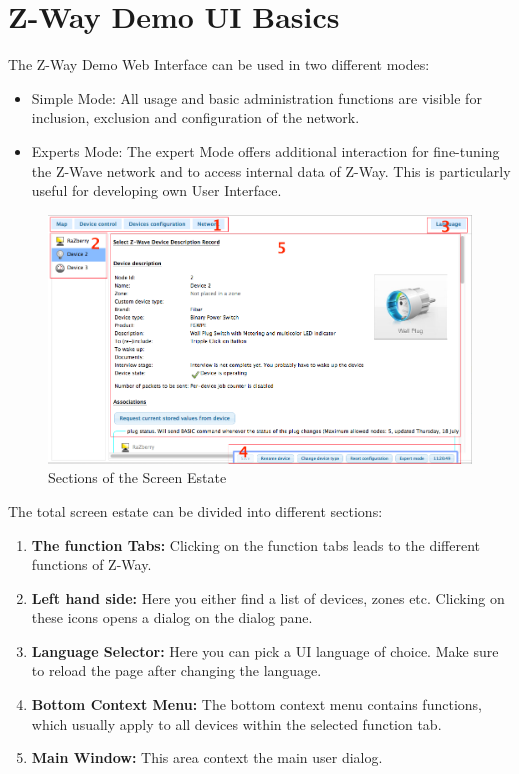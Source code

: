 \section{Z-Way Demo UI Basics}

The Z-Way Demo Web Interface can be used in two different modes:

\begin{itemize}
\item Simple Mode: All usage and basic administration functions are visible for inclusion, 
exclusion and configuration of the network. 

\item Experts Mode: The expert Mode offers additional interaction for fine-tuning the Z-Wave network
and to access internal data of Z-Way. This is particularly useful for developing own User Interface.
\end{itemize}
 
\begin{figure} 
\begin{center}
\includegraphics[scale=0.4]{pics/map3.png}
\caption{Sections of the Screen Estate}
\label{uc3:general} 
\end{center} 
\end{figure}


The total screen estate can be divided into different sections: 
\begin {enumerate}
\item {\bf The function Tabs:} Clicking on the function tabs leads to the different functions of Z-Way.
\item {\bf Left hand side:} Here you either find a list of devices, zones etc. Clicking on these icons opens a 
dialog on the dialog pane.
\item {\bf Language Selector:} Here you can pick a UI language of choice. Make sure to reload the page after changing
the language.
\item {\bf Bottom Context Menu:} The bottom context menu contains functions, which usually apply to all devices 
within the selected function tab.
\item {\bf Main Window:} This area context the main user dialog.
 
\end {enumerate}


